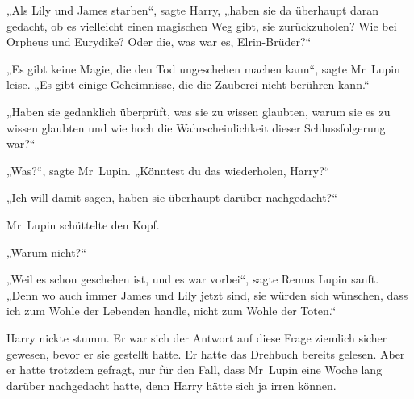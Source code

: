 „Als Lily und James starben“, sagte Harry, „haben sie da überhaupt daran gedacht, ob es vielleicht einen magischen Weg gibt, sie zurückzuholen? Wie bei Orpheus und Eurydike? Oder die, was war es, Elrin-Brüder?“

„Es gibt keine Magie, die den Tod ungeschehen machen kann“, sagte Mr~Lupin leise.
„Es gibt einige Geheimnisse, die die Zauberei nicht berühren kann.“

„Haben sie gedanklich überprüft, was sie zu wissen glaubten, warum sie es zu wissen glaubten und wie hoch die Wahrscheinlichkeit dieser Schlussfolgerung war?“

„Was?“, sagte Mr~Lupin.
„Könntest du das wiederholen, Harry?“

„Ich will damit sagen, haben sie überhaupt darüber nachgedacht?“

Mr~Lupin schüttelte den Kopf.

„Warum nicht?“

„Weil es schon geschehen ist, und es war vorbei“, sagte Remus Lupin sanft.
„Denn wo auch immer James und Lily jetzt sind, sie würden sich wünschen, dass ich zum Wohle der Lebenden handle, nicht zum Wohle der Toten.“

Harry nickte stumm. Er war sich der Antwort auf diese Frage ziemlich sicher gewesen, bevor er sie gestellt hatte. Er hatte das Drehbuch bereits gelesen. Aber er hatte trotzdem gefragt, nur für den Fall, dass Mr~Lupin eine Woche lang darüber nachgedacht hatte, denn Harry hätte sich ja irren können.

